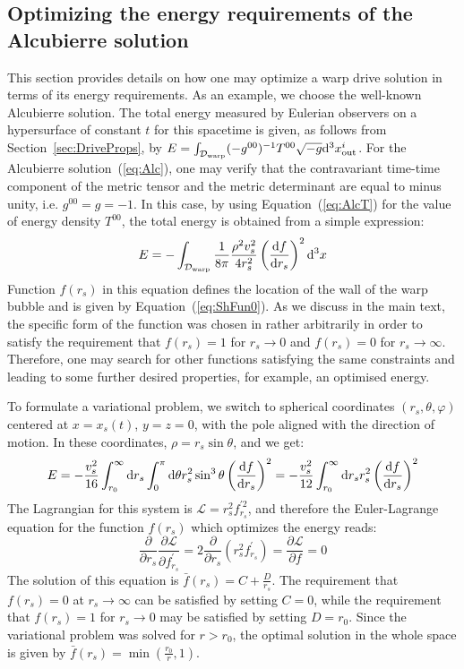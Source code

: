 \documentclass[10pt]{iopart}
\begin{document}
\subsection{Optimizing the energy requirements of the Alcubierre solution}
\label{sec:AppA3}

This section provides details on how one may optimize a warp drive solution in terms of its energy requirements. As an example, we choose the well-known Alcubierre solution. The total energy measured by Eulerian observers on a hypersurface of constant $t$ for this spacetime is given, as follows from Section~\ref{sec:DriveProps}, by $E=\int_{\mathcal{D}_{\rm warp}}(-g^{00})^{-1}T^{00}\sqrt{-g}{\rm d}^3 x^i_{\rm out}$. For the Alcubierre solution~(\ref{eq:Alc}), one may verify that the contravariant time-time component of the metric tensor and the metric determinant are equal to minus unity, i.e. $g^{00}=g=-1$. In this case, by using Equation~(\ref{eq:AlcT}) for the value of energy density $T^{00}$, the total energy is obtained from a simple expression:
\begin{equation}
    E = -\int_{\mathcal{D}_{\rm warp}} \frac{1}{8\pi}\frac{\rho^2 v_s^2}{4r_s^2}\left(\frac{{\rm d} f}{{\rm d} r_s}\right)^2 {\rm d}^3 x 
\end{equation}
Function $f(r_s)$ in this equation defines the location of the wall of the warp bubble and is given by Equation~(\ref{eq:ShFun0}). As we discuss in the main text, the specific form of the function was chosen in \cite{Alcubierre1994} rather arbitrarily in order to satisfy the requirement that $f(r_s)=1$ for $r_s\rightarrow0$ and $f(r_s)=0$ for $r_s\rightarrow\infty$. Therefore, one may search for other functions satisfying the same constraints and leading to some further desired properties, for example, an optimised energy.

To formulate a variational problem, we switch to spherical coordinates $(r_s,\theta,\varphi)$ centered at $x=x_s(t)$, $y=z=0$, with the pole aligned with the direction of motion. In these coordinates, $\rho = r_s \sin\theta$, and we get:
\begin{equation}
    E = -\frac{v_s^2}{16}\int_{r_0}^\infty{\rm d}r_s\int_0^{\pi}{\rm d}\theta r_s^2\sin^3\theta\left(\frac{{\rm d} f}{{\rm d} r_s}\right)^2 = -\frac{v_s^2}{12}\int_{r_0}^\infty{\rm d}r_s r_s^2\left(\frac{{\rm d} f}{{\rm d} r_s}\right)^2
\end{equation}
The Lagrangian for this system is $\mathcal{L}=r_s^2 f^{\prime 2}_{r_s}$, and therefore the Euler-Lagrange equation for the function $f(r_s)$ which optimizes the energy reads:
\begin{equation}
    \frac{\partial}{\partial r_s} \frac{\partial \mathcal{L}}{\partial f^{\prime}_{r_s}} = 2\frac{\partial}{\partial r_s} (r_s^2 f^{\prime}_{r_s}) = \frac{\partial \mathcal{L}}{\partial f} =  0
\end{equation}
The solution of this equation is $\bar{f}(r_s) = C + \frac{D}{r_s}$. The requirement that $f(r_s)=0$ at $r_s\rightarrow\infty$ can be satisfied by setting $C=0$, while the requirement that $f(r_s)=1$ for $r_s\rightarrow0$ may be satisfied by setting $D=r_0$. Since the variational problem was solved for $r>r_0$, the optimal solution in the whole space is given by $\bar{f}(r_s)=\min(\frac{r_0}{r},1)$. 
\end{document}
